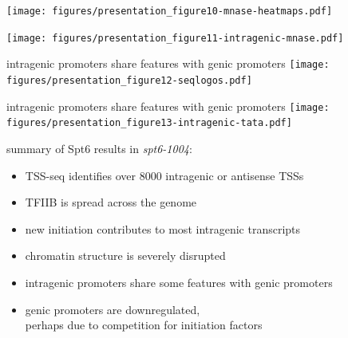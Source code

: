 \documentclass[aspectratio=169]{beamer}
\begin{document}
\begin{frame}
\texttt{[image: figures/presentation\_figure10-mnase-heatmaps.pdf]}
\end{frame}

\begin{frame}
\texttt{[image: figures/presentation\_figure11-intragenic-mnase.pdf]}
\end{frame}

\begin{frame}{intragenic promoters share features with genic promoters}
    \texttt{[image: figures/presentation\_figure12-seqlogos.pdf]}
\end{frame}

\begin{frame}{intragenic promoters share features with genic promoters}
    \texttt{[image: figures/presentation\_figure13-intragenic-tata.pdf]}
\end{frame}

\begin{frame}{summary of Spt6 results}
    in \textit{spt6-1004}:
    \begin{itemize}
        \item TSS-seq identifies over 8000 intragenic or antisense TSSs
        \item TFIIB is spread across the genome
        \item new initiation contributes to most intragenic transcripts
        \item chromatin structure is severely disrupted
        \item intragenic promoters share some features with genic promoters
        \item genic promoters are downregulated,\\perhaps due to competition for initiation factors
    \end{itemize}
\end{frame}
\end{document}
